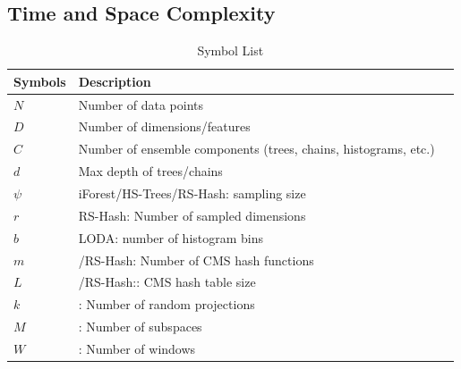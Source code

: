 \subsection{Time and Space Complexity}
%
%

\begin{table}[h!]
	\caption{Symbol List}
	\centering
	\begin{tabular}{lll}
		\toprule
		\textbf{Symbols} & \textbf{Description}	\\	\hline
		$N$ & Number of data points	\\	\hline
		$D$ & Number of dimensions/features	\\	\hline
		$C$ & Number of ensemble components (trees, chains, histograms, etc.)	\\	\hline
		$d$ & Max depth of trees/chains	\\	\hline
		$\psi$ & iForest/HS-Trees/RS-Hash: sampling size	\\	\hline
		$r$ & RS-Hash: Number of sampled dimensions	\\
		$b$ & LODA: number of histogram bins	\\	\hline
		$m$ & \method/RS-Hash: Number of CMS hash functions	\\
		$L$ & \method/RS-Hash:: CMS hash table size	\\	\hline
		$k$ & \method: Number of random projections	\\
		$M$ & \method: Number of subspaces	\\
		$W$ & \method: Number of windows	\\
		\bottomrule
	\end{tabular}
\end{table}

